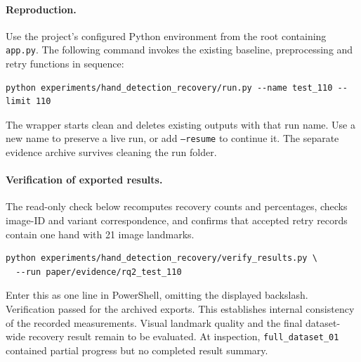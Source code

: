 \paragraph{Reproduction.}
Use the project's configured Python environment from the root containing \texttt{app.py}.
The following command invokes the existing baseline, preprocessing and retry functions in sequence:
\begin{verbatim}
python experiments/hand_detection_recovery/run.py --name test_110 --limit 110
\end{verbatim}
The wrapper starts clean and deletes existing outputs with that run name. Use a new name to preserve a live run, or add \texttt{--resume} to continue it. The separate evidence archive survives cleaning the run folder.

\paragraph{Verification of exported results.}
The read-only check below recomputes recovery counts and percentages, checks image-ID and variant correspondence, and confirms that accepted retry records contain one hand with 21 image landmarks.
\begin{verbatim}
python experiments/hand_detection_recovery/verify_results.py \
  --run paper/evidence/rq2_test_110
\end{verbatim}
Enter this as one line in PowerShell, omitting the displayed backslash.
Verification passed for the archived exports. This establishes internal consistency of the recorded measurements. Visual landmark quality and the final dataset-wide recovery result remain to be evaluated. At inspection, \texttt{full\_dataset\_01} contained partial progress but no completed result summary.

